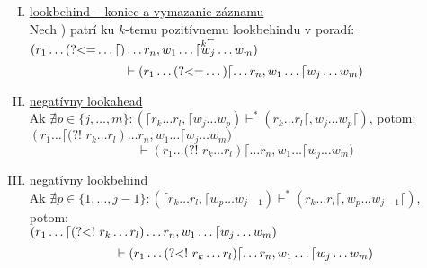 \documentclass{svk_long_sk}
\def\nlookahead{\text{(?!~}}
\def\lookbehind{\text{(?\textless =}}
\def\nlookbehind{\text{(?\textless !~}}
\begin{document}
\begin{definition}
\begin{enumerate}[I.]
\item \underline{lookbehind -- koniec a vymazanie záznamu}
\\ Nech ) patrí ku $k$-temu pozitívnemu lookbehindu v poradí:
\\ $\displaystyle{(r_1\dots \lookbehind\dots\lceil) \dots r_n, w_1\dots \lceil \mathop{w_j}^{\mathop{k}^\leftarrow} \dots w_m )}$
$$ \vdash(r_1\dots \lookbehind\dots)\lceil \dots r_n, w_1 \dots \lceil w_j \dots w_m ) $$
\item \underline{negatívny lookahead}
\\ Ak $\nexists p \in \lbrace j,\dots,m\rbrace: (\lceil r_k\dots r_l,\lceil w_j\dots w_p) \vdash^* (r_k\dots r_l\lceil, w_j\dots w_p \lceil)$, potom:
\\$\displaystyle{(r_1\dots\lceil \nlookahead r_{k}\dots r_{l} ) \dots r_n, w_1\dots \lceil w_j \dots w_m)}$
$$\vdash (r_1\dots \nlookahead r_{k}\dots r_{l} ) \lceil\dots r_n, w_1\dots \lceil w_j \dots w_m)$$
\item \underline{negatívny lookbehind}
\\ Ak $\nexists p \in \lbrace 1,\dots,j-1\rbrace: (\lceil r_k\dots r_l,\lceil w_p\dots w_{j-1}) \vdash^* (r_k\dots r_l\lceil, w_p \dots w_{j-1} \lceil)$, potom:
\\$\displaystyle{(r_1\dots\lceil \nlookbehind r_{k}\dots r_{l} ) \dots r_n, w_1\dots \lceil w_j \dots w_m)}$
$$\vdash (r_1\dots \nlookbehind r_{k}\dots r_{l} ) \lceil\dots r_n, w_1\dots \lceil w_j \dots w_m)$$
\end{enumerate}
\end{definition}
\end{document}
